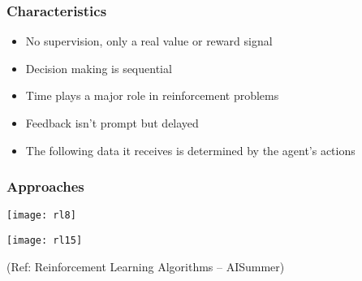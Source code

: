 


\begin{frame}[fragile]\frametitle{Characteristics}
\begin{itemize}
\item No supervision, only a real value or reward signal
\item Decision making is sequential
\item Time plays a major role in reinforcement problems
\item Feedback isn’t prompt but delayed
\item The following data it receives is determined by the agent’s actions
\end{itemize}
\end{frame}


\begin{frame}[fragile]\frametitle{Approaches}

\begin{center}
\texttt{[image: rl8]}

\texttt{[image: rl15]}

\end{center}

{\tiny (Ref: Reinforcement Learning Algorithms – AISummer)} 


\end{frame}


